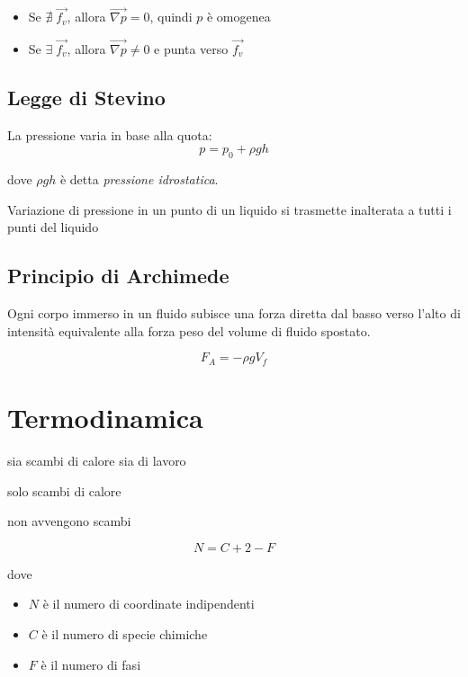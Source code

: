 \begin{itemize}
    \item Se $\nexists \; \vec{f_v}$, allora $\vec{\nabla{p}}=0$, quindi $p$ è omogenea
    \item Se $\exists \; \vec{f_v}$, allora $\vec{\nabla{p}}\neq0$ e punta verso $\vec{f_v}$
\end{itemize}

\subsection{Legge di Stevino}
La pressione varia in base alla quota:
\begin{equation}
    \boxed{p = p_0 +  \rho gh}
\end{equation}

dove $\rho gh$ è detta \emph{pressione idrostatica}.

 Variazione di pressione in un punto di un liquido si trasmette inalterata a tutti i punti del liquido

\subsection{Principio di Archimede}
Ogni corpo immerso in un fluido subisce una forza diretta dal basso verso l'alto di intensità equivalente alla forza peso del volume di fluido spostato.

\begin{equation}
    \boxed{F_A = - \rho g V_f}
\end{equation}

\section{Termodinamica}

 sia scambi di calore sia di lavoro
\vspace{\baselineskip}

 solo scambi di calore
\vspace{\baselineskip}

 non avvengono scambi
\vspace{\baselineskip}

\begin{equation}
N = C + 2 -F
\end{equation}

dove 
\begin{itemize}
    \item $N$ è il numero di coordinate indipendenti
    \item $C$ è il numero di specie chimiche
    \item $F$ è il numero di fasi
\end{itemize}


